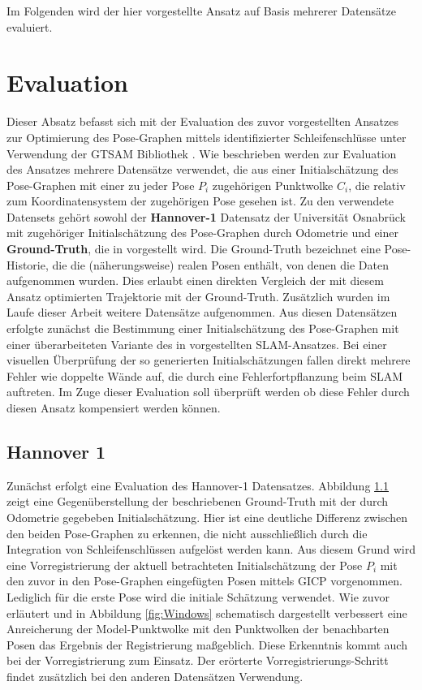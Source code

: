 Im Folgenden wird der hier vorgestellte Ansatz auf Basis mehrerer Datensätze evaluiert.

\section{Evaluation}

Dieser Absatz befasst sich mit der Evaluation des zuvor vorgestellten Ansatzes zur Optimierung des Pose-Graphen mittels identifizierter Schleifenschlüsse unter Verwendung der GTSAM Bibliothek \cite{dellaert2012factor}. Wie beschrieben werden zur Evaluation des Ansatzes mehrere Datensätze verwendet, die aus einer Initialschätzung des Pose-Graphen mit einer zu jeder Pose $P_i$ zugehörigen Punktwolke $C_i$, die relativ zum Koordinatensystem der zugehörigen Pose gesehen ist. Zu den verwendete Datensets gehört sowohl der \textbf{Hannover-1} Datensatz der Universität Osnabrück mit zugehöriger Initialschätzung des Pose-Graphen durch Odometrie und einer \textbf{Ground-Truth}, die in \cite{sprickerhof2011heuristic} vorgestellt wird. Die Ground-Truth bezeichnet eine Pose-Historie, die die (näherungsweise) realen Posen enthält, von denen die Daten aufgenommen wurden. Dies erlaubt einen direkten Vergleich der mit diesem Ansatz optimierten Trajektorie mit der Ground-Truth. Zusätzlich wurden im Laufe dieser Arbeit weitere Datensätze aufgenommen. Aus diesen Datensätzen erfolgte zunächst die Bestimmung einer Initialschätzung des Pose-Graphen mit einer überarbeiteten Variante des in \cite{zhang2014loam} vorgestellten SLAM-Ansatzes. Bei einer visuellen Überprüfung der so generierten Initialschätzungen fallen direkt mehrere Fehler wie doppelte Wände auf, die durch eine Fehlerfortpflanzung beim SLAM auftreten. Im Zuge dieser Evaluation soll überprüft werden ob diese Fehler durch diesen Ansatz kompensiert werden können.

\subsection{Hannover 1}

Zunächst erfolgt eine Evaluation des Hannover-1 Datensatzes. Abbildung \ref{} zeigt eine Gegenüberstellung der beschriebenen Ground-Truth mit der durch Odometrie gegebeben Initialschätzung. Hier ist eine deutliche Differenz zwischen den beiden Pose-Graphen zu erkennen, die nicht ausschließlich durch die Integration von Schleifenschlüssen aufgelöst werden kann. Aus diesem Grund wird eine Vorregistrierung der aktuell betrachteten Initialschätzung der Pose $P_i$ mit den zuvor in den Pose-Graphen eingefügten Posen mittels GICP vorgenommen. Lediglich für die erste Pose wird die initiale Schätzung verwendet. Wie zuvor erläutert und in Abbildung \ref{fig:Windows} schematisch dargestellt verbessert eine Anreicherung der Model-Punktwolke mit den Punktwolken der benachbarten Posen das Ergebnis der Registrierung maßgeblich. Diese Erkenntnis kommt auch bei der Vorregistrierung zum Einsatz. Der erörterte Vorregistrierungs-Schritt findet zusätzlich bei den anderen Datensätzen Verwendung.


